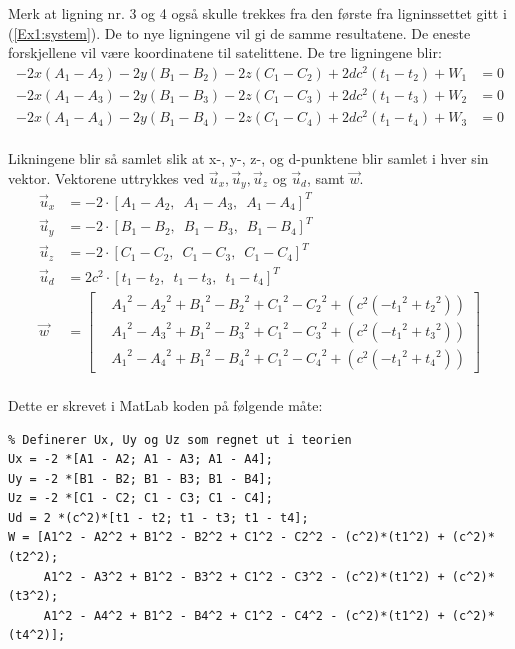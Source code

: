 Merk at ligning nr. 3 og 4 også skulle trekkes fra den første fra ligninssettet gitt i (\ref{Ex1:system}). De to nye ligningene vil gi de samme resultatene. De eneste forskjellene vil være koordinatene til satelittene. De tre ligningene blir:
\begin{align}
- 2x({A_1} - {A_2}) - 2y({B_1} - {B_2}) - 2z({C_1} - {C_2}) + 2d{c^2}({t_1} - {t_2}) + W_1 &= 0 \nonumber \\
- 2x({A_1} - {A_3}) - 2y({B_1} - {B_3}) - 2z({C_1} - {C_3}) + 2d{c^2}({t_1} - {t_3}) + W_2 &= 0  \nonumber\\
- 2x({A_1} - {A_4}) - 2y({B_1} - {B_4}) - 2z({C_1} - {C_4}) + 2d{c^2}({t_1} - {t_4}) + W_3 &= 0 \nonumber \\ \label{Ex1:3equations}
\end{align}

Likningene blir så samlet slik at x-, y-, z-, og d-punktene blir samlet i hver sin vektor. Vektorene uttrykkes ved ${\vec u_x}, {\vec u_y}, {\vec u_z}$ og  ${\vec u_d}$, samt $\vec{w}$. 
\begin{align}
	{\vec u_x} &=  - 2\cdot[{A_1} - {A_2}, \enspace {A_1} - {A_3},  \enspace{A_1} - {A_4}]^T \nonumber \\
	{\vec u_y} &=  - 2\cdot[{B_1} - {B_2},  \enspace{B_1} - {B_3},  \enspace{B_1} - {B_4}]^T \nonumber \\
	{\vec u_z} &=  - 2\cdot[{C_1} - {C_2},  \enspace{C_1} - {C_3},  \enspace{C_1} - {C_4}]^T \nonumber \\
	{\vec u_d} &=  2c^2\cdot[{t_1} - {t_2},  \enspace{t_1} - {t_3},  \enspace{t_1} - {t_4}]^T \nonumber \\
	{\vec w}  &= 
	\begin{bmatrix}
		&{A_1}^2 - {A_2}^2 + {B_1}^2 - {B_2}^2 + {C_1}^2 - {C_2}^2 + ({c^2}( - {t_1}^2 + {t_2}^2)) \\
		&{A_1}^2 - {A_3}^2 + {B_1}^2 - {B_3}^2 + {C_1}^2 - {C_3}^2 + ({c^2}( - {t_1}^2 + {t_3}^2)) \\ 
		&{A_1}^2 - {A_4}^2 + {B_1}^2 - {B_4}^2 + {C_1}^2 - {C_4}^2 + ({c^2}( - {t_1}^2 + {t_4}^2))
	\end{bmatrix}\nonumber \\ \nonumber
\end{align}

Dette er skrevet i MatLab koden på følgende måte: 

\begin{lstlisting}
% Definerer Ux, Uy og Uz som regnet ut i teorien 
Ux = -2 *[A1 - A2; A1 - A3; A1 - A4];
Uy = -2 *[B1 - B2; B1 - B3; B1 - B4];
Uz = -2 *[C1 - C2; C1 - C3; C1 - C4];
Ud = 2 *(c^2)*[t1 - t2; t1 - t3; t1 - t4];
W = [A1^2 - A2^2 + B1^2 - B2^2 + C1^2 - C2^2 - (c^2)*(t1^2) + (c^2)*(t2^2); 
     A1^2 - A3^2 + B1^2 - B3^2 + C1^2 - C3^2 - (c^2)*(t1^2) + (c^2)*(t3^2); 
     A1^2 - A4^2 + B1^2 - B4^2 + C1^2 - C4^2 - (c^2)*(t1^2) + (c^2)*(t4^2)]; 
\end{lstlisting}

